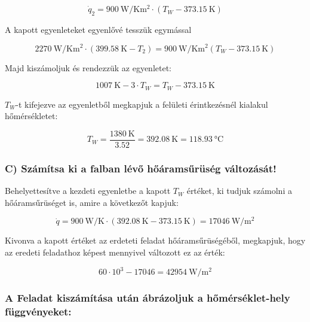  \begin{equation}   
    \dot{q}_2 = \SI{900}{\watt\per\kelvin\meter\squared} \cdot (T_W - \SI{373.15}{\kelvin})
\end{equation}

A kapott egyenleteket egyenlővé tesszük egymással
    
\begin{equation}    
     \SI{2270}{\watt\per\kelvin\meter\squared} \cdot (\SI{399.58}{\kelvin}-T_2) =  \SI{900}{\watt\per\kelvin\meter\squared}(T_W-\SI{373.15}{\kelvin})
\end{equation}

Majd kiszámoljuk és rendezzük az egyenletet:

\begin{equation}
    \SI{1007}{\kelvin}-3 \cdot T_W = T_W-\SI{373.15}{\kelvin}
\end{equation}
        
$T_W$-t kifejezve az egyenletből megkapjuk a felületi érintkezésnél kialakul hőmérsékletet:

\begin{equation}
    T_W = \frac{\SI{1380}{\kelvin}}{3.52} = \SI{392.08}{\kelvin} = \SI{118,93}{\celsius}
\end{equation}
    
\subsubsection*{C) Számítsa ki a falban lévő hőáramsűrüség változását!}
    
Behelyettesítve a kezdeti egyenletbe a kapott $T_W$ értéket, ki tudjuk számolni a hőáramsűrüséget is, amire a következőt kapjuk:
    
\begin{equation}
     \dot{q} = \SI{900}{\watt\per\K} \cdot (\SI{392.08}{\kelvin} - \SI{373.15}{\kelvin}) = \SI{17046}{\watt\per\meter\squared}
\end{equation}

Kivonva a kapott értéket az erdeteti feladat hőáramsűrüségéből, megkapjuk, hogy az eredeti feladathoz képest mennyivel változott ez az érték:

\begin{equation}
            60 \cdot 10^3 - 17046 =  \SI{42954}{\watt\per\meter\squared}
\end{equation}

\subsubsection*{A Feladat kiszámítása után ábrázoljuk a hőmérséklet-hely függvényeket:}

